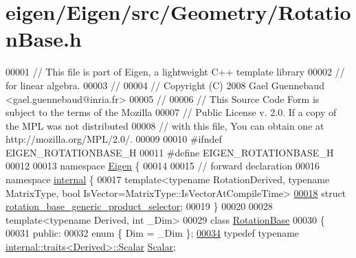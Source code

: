 \hypertarget{eigen_2_eigen_2src_2_geometry_2_rotation_base_8h_source}{}\section{eigen/\+Eigen/src/\+Geometry/\+Rotation\+Base.h}
\label{eigen_2_eigen_2src_2_geometry_2_rotation_base_8h_source}

\begin{DoxyCode}
00001 \textcolor{comment}{// This file is part of Eigen, a lightweight C++ template library}
00002 \textcolor{comment}{// for linear algebra.}
00003 \textcolor{comment}{//}
00004 \textcolor{comment}{// Copyright (C) 2008 Gael Guennebaud <gael.guennebaud@inria.fr>}
00005 \textcolor{comment}{//}
00006 \textcolor{comment}{// This Source Code Form is subject to the terms of the Mozilla}
00007 \textcolor{comment}{// Public License v. 2.0. If a copy of the MPL was not distributed}
00008 \textcolor{comment}{// with this file, You can obtain one at http://mozilla.org/MPL/2.0/.}
00009 
00010 \textcolor{preprocessor}{#ifndef EIGEN\_ROTATIONBASE\_H}
00011 \textcolor{preprocessor}{#define EIGEN\_ROTATIONBASE\_H}
00012 
00013 \textcolor{keyword}{namespace }\hyperlink{namespace_eigen}{Eigen} \{ 
00014 
00015 \textcolor{comment}{// forward declaration}
00016 \textcolor{keyword}{namespace }\hyperlink{namespaceinternal}{internal} \{
00017 \textcolor{keyword}{template}<\textcolor{keyword}{typename} RotationDerived, \textcolor{keyword}{typename} MatrixType, \textcolor{keywordtype}{bool} IsVector=MatrixType::IsVectorAtCompileTime>
\hyperlink{struct_eigen_1_1internal_1_1rotation__base__generic__product__selector}{00018} \textcolor{keyword}{struct }\hyperlink{struct_eigen_1_1internal_1_1rotation__base__generic__product__selector}{rotation\_base\_generic\_product\_selector};
00019 \}
00020 
00028 \textcolor{keyword}{template}<\textcolor{keyword}{typename} Derived, \textcolor{keywordtype}{int} \_Dim>
00029 \textcolor{keyword}{class }\hyperlink{class_eigen_1_1_rotation_base}{RotationBase}
00030 \{
00031   \textcolor{keyword}{public}:
00032     \textcolor{keyword}{enum} \{ Dim = \_Dim \};
\hyperlink{class_eigen_1_1_rotation_base_af9b43eac462d7aa70b018efd49c13ef4}{00034}     \textcolor{keyword}{typedef} \textcolor{keyword}{typename} \hyperlink{struct_eigen_1_1internal_1_1traits}{internal::traits<Derived>::Scalar} 
      \hyperlink{class_eigen_1_1_rotation_base_af9b43eac462d7aa70b018efd49c13ef4}{Scalar};

\end{DoxyCode}
